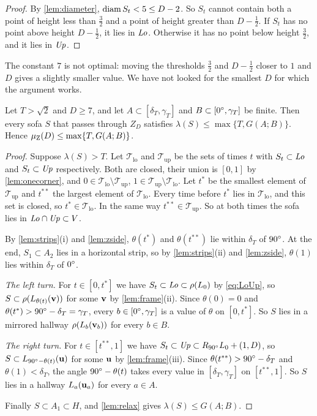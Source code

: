 \begin{proof}
By \cref{lem:diameter}, $\operatorname{diam} S_t<5\le D-2$. So $S_t$ cannot contain both a point of height less than $\frac32$ and a point of height greater than $D-\frac12$. If $S_t$ has no point above height $D-\frac12$, it lies in $\mathit{Lo}$. Otherwise it has no point below height $\frac32$, and it lies in $\mathit{Up}$.
\end{proof}

The constant $7$ is not optimal: moving the thresholds $\frac32$ and $D-\frac12$ closer to $1$ and $D$ gives a slightly smaller value. We have not looked for the smallest $D$ for which the argument works.

\begin{thm}\label{thm:reductionZ}
Let $T>\sqrt2$ and $D\ge7$, and let $A\subset[\delta_T,\gamma_T]$ and $B\subset[0^{\circ},\gamma_T]$ be finite. Then every sofa $S$ that passes through $Z_D$ satisfies $\lambda(S)\le\max\{T,G(A;B)\}$. Hence $\mu_{\mathrm{Z}}(D)\le\max\{T,G(A;B)\}$.
\end{thm}

\begin{proof}
Suppose $\lambda(S)>T$. Let $\mathcal{T}_{\mathrm{lo}}$ and $\mathcal{T}_{\mathrm{up}}$ be the sets of times $t$ with $S_t\subset\mathit{Lo}$ and $S_t\subset\mathit{Up}$ respectively. Both are closed, their union is $[0,1]$ by \cref{lem:onecorner}, and $0\in\mathcal{T}_{\mathrm{lo}}\setminus\mathcal{T}_{\mathrm{up}}$, $1\in\mathcal{T}_{\mathrm{up}}\setminus\mathcal{T}_{\mathrm{lo}}$. Let $t^*$ be the smallest element of $\mathcal{T}_{\mathrm{up}}$ and $t^{**}$ the largest element of $\mathcal{T}_{\mathrm{lo}}$. Every time before $t^*$ lies in $\mathcal{T}_{\mathrm{lo}}$, and this set is closed, so $t^*\in\mathcal{T}_{\mathrm{lo}}$. In the same way $t^{**}\in\mathcal{T}_{\mathrm{up}}$. So at both times the sofa lies in $\mathit{Lo}\cap\mathit{Up}\subset V$.

By \cref{lem:strips}(i) and \cref{lem:zside}, $\theta(t^*)$ and $\theta(t^{**})$ lie within $\delta_T$ of $90^{\circ}$. At the end, $S_1\subset A_2$ lies in a horizontal strip, so by \cref{lem:strips}(ii) and \cref{lem:zside}, $\theta(1)$ lies within $\delta_T$ of $0^{\circ}$.

\emph{The left turn.} For $t\in[0,t^*]$ we have $S_t\subset\mathit{Lo}\subset\rho(L_0)$ by \eqref{eq:LoUp}, so $S\subset\rho(L_{\theta(t)}(\mathbf{v}))$ for some $\mathbf{v}$ by \cref{lem:frame}(ii). Since $\theta(0)=0$ and $\theta(t^*)>90^{\circ}-\delta_T=\gamma_T$, every $b\in[0^{\circ},\gamma_T]$ is a value of $\theta$ on $[0,t^*]$. So $S$ lies in a mirrored hallway $\rho(L_b(\mathbf{v}_b))$ for every $b\in B$.

\emph{The right turn.} For $t\in[t^{**},1]$ we have $S_t\subset\mathit{Up}\subset R_{90^{\circ}}L_0+(1,D)$, so $S\subset L_{90^{\circ}-\theta(t)}(\mathbf{u})$ for some $\mathbf{u}$ by \cref{lem:frame}(iii). Since $\theta(t^{**})>90^{\circ}-\delta_T$ and $\theta(1)<\delta_T$, the angle $90^{\circ}-\theta(t)$ takes every value in $[\delta_T,\gamma_T]$ on $[t^{**},1]$. So $S$ lies in a hallway $L_a(\mathbf{u}_a)$ for every $a\in A$.

Finally $S\subset A_1\subset H$, and \cref{lem:relax} gives $\lambda(S)\le G(A;B)$.
\end{proof}

